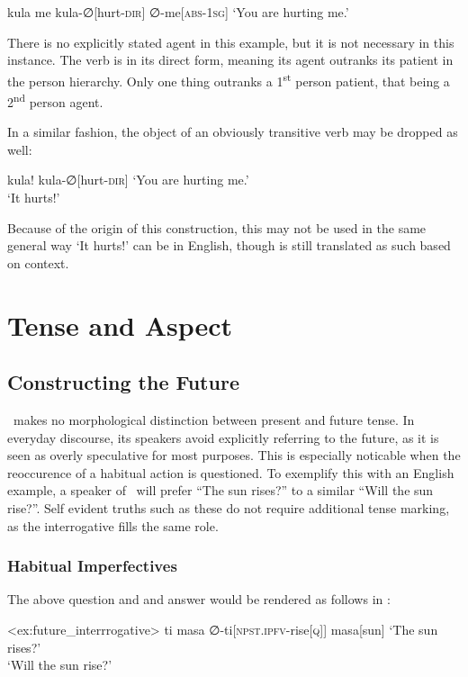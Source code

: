 \ex
\begingl
\glpreamble kula me
\endpreamble
kula-∅[hurt-\textsc{dir}]
∅-me[\textsc{abs-1sg}]
\glft `You are hurting me.'
\endgl
\xe

There is no explicitly stated agent in this example, but it is not necessary in this instance.
The verb  is in its direct form, meaning its agent outranks its patient in the person hierarchy.
Only one thing outranks a 1\textsuperscript{st} person patient, that being a 2\textsuperscript{nd} person agent.

In a similar fashion, the object of an obviously transitive verb may be dropped as well:

\ex
\begingl
\glpreamble kula!
\endpreamble
kula-∅[hurt-\textsc{dir}]
\glft `You are hurting me.'\\`It hurts!'
\endgl
\xe

Because of the origin of this construction, this may not be used in the same general way `It hurts!' can be in English, though  is still translated as such based on context.

\section{Tense and Aspect}
\subsection{Constructing the Future}

\langname\ makes no morphological distinction between present and future tense.
In everyday discourse, its speakers avoid explicitly referring to the future, as it is seen as overly speculative for most purposes.
This is especially noticable when the reoccurence of a habitual action is questioned.
To exemplify this with an English example, a speaker of \langname\ will prefer ``The sun rises?'' to a similar ``Will the sun rise?''.
Self evident truths such as these do not require additional tense marking, as the interrogative fills the same role.

\subsubsection{Habitual Imperfectives}

The above question and and answer would be rendered as follows in \langname :

\ex<ex:future_interrrogative>
\begingl
\glpreamble ti masa
\endpreamble
∅-ti[\textsc{npst.ipfv-}rise\textsc{[q]}]
masa[sun]
\glft `The sun rises?'\\`Will the sun rise?'
\endgl
\xe

